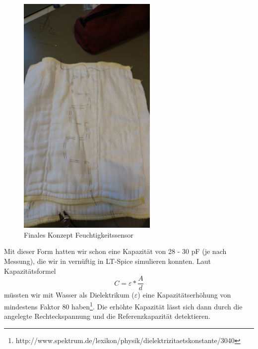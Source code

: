 \begin{figure}[ht]
	\centering
		\includegraphics[width=0.6\textwidth]{includes/kom/graphics/cap_sensor_final}
	\caption{Finales Konzept Feuchtigkeitssensor}
	\label{fig:cap_sensor_final}
\end{figure}

Mit dieser Form hatten wir schon eine Kapazität von 28 - 30 pF (je nach Messung), die wir in vernüftig in LT-Spice simulieren konnten. Laut Kapazitätsformel 
\[C =  \varepsilon * \frac{A}{d}\]
müssten wir mit Wasser als Dielektrikum ($\varepsilon$) eine Kapazitätserhöhung von mindestens Faktor 80 haben\footnote{http://www.spektrum.de/lexikon/physik/dielektrizitaetskonstante/3040}. Die erhöhte Kapazität lässt sich dann durch die angelegte Rechteckspannung und die Referenzkapazität detektieren.

